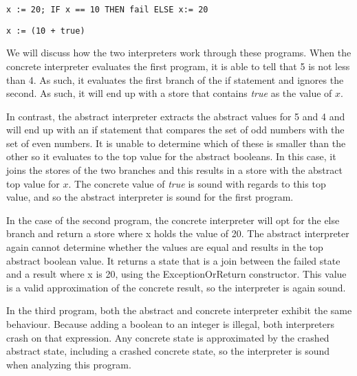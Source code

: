 \begin{lstlisting}
x := 20; IF x == 10 THEN fail ELSE x:= 20
\end{lstlisting}

\begin{lstlisting}
x := (10 + true)
\end{lstlisting}

We will discuss how the two interpreters work through these programs. When the
concrete interpreter evaluates the first program, it is able to tell that 5 is
not less than 4. As such, it evaluates the first branch of the if statement and
ignores the second. As such, it will end up with a store that contains
\textit{true} as the value of $x$.

In contrast, the abstract interpreter extracts the abstract values for 5 and 4
and will end up with an if statement that compares the set of odd numbers with
the set of even numbers. It is unable to determine which of these is smaller
than the other so it evaluates to the top value for the abstract booleans. In
this case, it joins the stores of the two branches and this results in a store
with the abstract top value for $x$. The concrete value of \textit{true} is
sound with regards to this top value, and so the abstract interpreter is sound
for the first program.

In the case of the second program, the concrete interpreter will opt for the
else branch and return a store where x holds the value of 20. The abstract
interpreter again cannot determine whether the values are equal and results in
the top abstract boolean value. It returns a state that is a join between the
failed state and a result where x is 20, using the ExceptionOrReturn
constructor. This value is a valid approximation of the concrete result, so the
interpreter is again sound.

In the third program, both the abstract and concrete interpreter exhibit the
same behaviour. Because adding a boolean to an integer is illegal, both
interpreters crash on that expression. Any concrete state is approximated by
the crashed abstract state, including a crashed concrete state, so the
interpreter is sound when analyzing this program.

